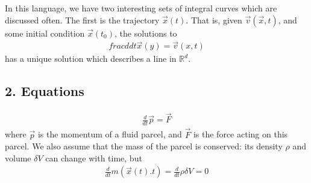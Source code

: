\documentclass[letterpaper,10pt,english]{jupyterBook}
\begin{document}
\sphinxAtStartPar
In this language, we have two interesting sets of integral curves which
are discussed often. The first is the trajectory \({\vec x}(t)\). That is,
given \({\vec v}({\vec x},t)\), and some initial condition \({\vec x}(t_0)\),
the solutions to
\begin{equation}\label{equation:chapter1/euler:trajectory}
\begin{split}frac{d}{dt} {\vec x}(y) = {\vec v}(x,t)\end{split}
\end{equation}
\sphinxAtStartPar
has a unique solution which describes a line in \({\mathbb R}^d\).


\subsection{2. Equations}
\label{\detokenize{chapter1/euler:equations}}\begin{equation}\label{equation:chapter1/euler:newton_second}
\begin{split}\frac{d}{dt} {\vec p} = {\vec F}\end{split}
\end{equation}
\sphinxAtStartPar
where \({\vec p}\) is the momentum of a fluid parcel, and \({\vec F}\) is the
force acting on this parcel. We also assume that the mass of the parcel is
conserved: its density \(\rho\) and volume \(\delta V\) can change with time,
but
\begin{equation}\label{equation:chapter1/euler:mass_cons}
\begin{split}\frac{d}{dt} m({\vec x}(t).t) = \frac{d}{dt} \rho \delta V = 0\end{split}
\end{equation}
\end{document}
